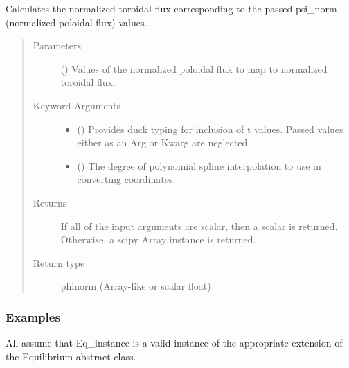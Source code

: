 \documentclass[letterpaper,10pt,english]{sphinxmanual}
\begin{document}
\begin{fulllineitems}
\begin{fulllineitems}
\label{\detokenize{eqtools:eqtools.eqdskreader.EqdskReader.psinorm2phinorm}}
Calculates the normalized toroidal flux corresponding to the passed
psi\_norm (normalized poloidal flux) values.
\begin{quote}\begin{description}
\item[{Parameters}] \leavevmode
{} () \textendash{} Values of the normalized
poloidal flux to map to normalized toroidal flux.

\item[{Keyword Arguments}] \leavevmode\begin{itemize}
\item {} 
 () \textendash{} Provides duck typing for inclusion of t values.
Passed  values either as an Arg or Kwarg are neglected.

\item {} 
 () \textendash{} The degree of polynomial spline interpolation to
use in converting coordinates.

\end{itemize}

\item[{Returns}] \leavevmode
If all of the input arguments
are scalar, then a scalar is returned. Otherwise, a scipy Array
instance is returned.

\item[{Return type}] \leavevmode
phinorm (Array-like or scalar float)

\end{description}\end{quote}
\subsubsection*{Examples}

All assume that Eq\_instance is a valid instance of the appropriate
extension of the Equilibrium abstract class.


\end{fulllineitems}
\end{fulllineitems}
\end{document}
